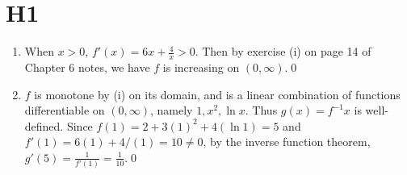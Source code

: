 \documentclass{article}
\title{\mytitle}
\author{\myname}
\date{\today}
\theoremstyle{plain}
\begin{document}
\maketitle
\section*{H1}
\begin{enumerate}
\item When $x>0$, $f'(x)=6x+\frac{4}{x}>0$. Then by exercise (i) on page 14 of
        Chapter 6 notes, we have $f$ is increasing on $(0,\infty)$.\qed
  \item $f$ is monotone by (i) on its domain, and is a linear combination of
        functions differentiable on $(0,\infty)$, namely $1, x^{2},\ln x$. Thus
        $g(x)=f^{-1}x$ is well-defined. Since $f(1)=2+3(1)^{2}+4(\ln1)=5$ and
        $f'(1)=6(1)+4/(1)=10\neq0$, by the inverse function theorem,
        $g'(5)=\frac{1}{f'(1)}=\frac{1}{10}$.\qed
\end{enumerate}
\end{document}
